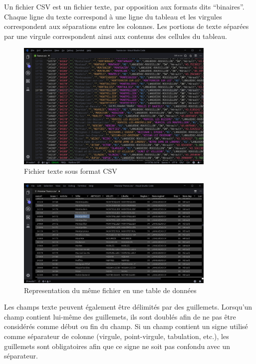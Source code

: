 \documentclass[oneside,13pt,a4paper]{report}
\begin{document}
Un fichier CSV est un fichier texte, par opposition aux formats dits \enquote{binaires}.
Chaque ligne du texte correspond à une ligne du tableau et les virgules correspondent aux séparations entre les colonnes. 
Les portions de texte séparées par une virgule correspondent ainsi aux contenus des cellules du tableau.

\begin{figure}[!h]
	\centering
	\includegraphics[width=0.85\textwidth]{img/csv.png}
	\caption{Fichier texte sous format CSV}
\end{figure}

\begin{figure}[!h]
	\centering
	\includegraphics[width=0.85\textwidth]{img/csv_tables.png}
	\caption{Representation du même fichier en une table de données}
\end{figure}

Les champs texte peuvent également être délimités par des guillemets. Lorsqu'un champ contient lui-même des guillemets, ils sont doublés afin de ne pas être considérés comme début ou fin du champ. 
Si un champ contient un signe utilisé comme séparateur de colonne (virgule, point-virgule, tabulation, etc.), les guillemets sont obligatoires afin que ce signe ne soit pas confondu avec un séparateur.
\end{document}

